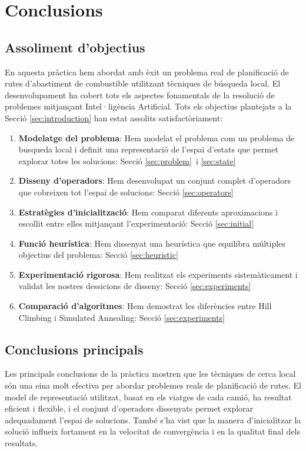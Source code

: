 \section{Conclusions}
\label{sec:conclusions}

\subsection{Assoliment d'objectius}

En aquesta pràctica hem abordat amb èxit un problema real de planificació de rutes d'abastiment de combustible utilitzant tècniques de búsqueda local. El desenvolupament ha cobert tots els aspectes fonamentals de la resolució de problemes mitjançant Intel·ligència Artificial. Tots els objectius plantejats a la Secció \ref{sec:introduction} han estat assolits satisfactòriament:

\begin{enumerate}
    \item \textbf{Modelatge del problema}: Hem modelat el problema com un problema de busqueda local i definit una representació de l'espai d'estats que permet explorar totes les solucions: Secció \ref{sec:problem}\ i \ref{sec:state} \
    
    \item \textbf{Disseny d'operadors}: Hem desenvolupat un conjunt complet d'operadors que cobreixen tot l'espai de solucions: Secció  \ref{sec:operators} \
    
    \item \textbf{Estratègies d'inicialització}: Hem comparat diferents aproximacions i escollit entre elles mitjançant l'experimentació: Secció \ref{sec:initial} \
    
    \item \textbf{Funció heurística}: Hem dissenyat una heurística que equilibra múltiples objectius del problema: Secció \ref{sec:heuristic} \
    
    \item \textbf{Experimentació rigorosa}: Hem realitzat els experiments sistemàticament i validat les nostres dessicions de disseny: Secció  \ref{sec:experiments} \
    
    \item \textbf{Comparació d'algoritmes}: Hem demostrat les diferències entre Hill Climbing i Simulated Annealing: Secció \ref{sec:experiments} \
    
\end{enumerate}


\subsection{Conclusions principals}
Les principals conclusions de la pràctica mostren que les tècniques de cerca local són una eina molt efectiva per abordar problemes reals de planificació de rutes. El model de representació utilitzat, basat en els viatges de cada camió, ha resultat eficient i flexible, i el conjunt d’operadors dissenyats permet explorar adequadament l’espai de solucions. També s’ha vist que la manera d’inicialitzar la solució influeix fortament en la velocitat de convergència i en la qualitat final dels resultats. \\

